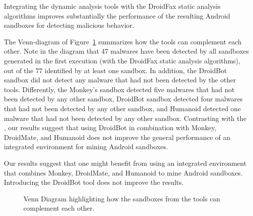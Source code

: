 \begin{finding}
  Integrating the dynamic analysis tools
  with the DroidFax static analysis algorithms
  improves substantially the performance
  of the resulting Android sandboxes for
  detecting malicious behavior. 
\end{finding}
 
The Venn-diagram of Figure~\ref{fig:venn-plot1}
summarizes how the tools can complement each other.
Note in the diagram that 47 malwares have been detected by all sandboxes generated in the first execution (with the DroidFax static analysis algorithms), out of the 77 identified by at least one sandbox. In addition, the DroidBot sandbox did not detect any malware that had not been detected by the other tools. Differently, the Monkey's sandbox detected five malwares that had not been detected by any other sandbox, DroidBot sandbox detected four malwares that had not been detected by any other sandbox, and Humanoid detected one malware that had not been detected by any other sandbox. Contrasting with the \blls,
our results suggest that using DroidBot in combination with Monkey, DroidMate, and Humanoid does not improve the general performance of an integrated environment for mining
Android sandboxes.  

\begin{finding}
  Our results suggest that one might benefit from using  an integrated
  environment that combines Monkey, DroidMate, and Humanoid to
  mine Android sandboxes. Introducing the DroidBot 
  tool does not improve the results.
\end{finding}


\begin{figure}[htb]
  \caption{Venn Diagram highlighting how the sandboxes from the tools can
    complement each other.}
  \label{fig:venn-plot1}
\end{figure}


